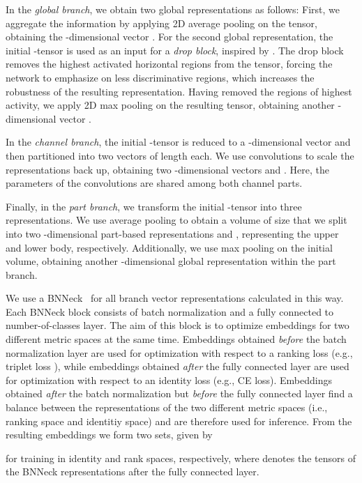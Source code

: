 \documentclass{article}
\begin{document}
In the \emph{global branch}, we obtain two global representations as follows: First, we aggregate the information by applying 2D average pooling on the tensor, obtaining the -dimensional vector . For the second global representation, the initial -tensor is used as an input for a \emph{drop block}, inspired by \cite{quispe2020top}. The drop block removes the highest activated horizontal regions from the tensor, forcing the network to emphasize on less discriminative regions, which increases the robustness of the resulting representation. Having removed the regions of highest activity, we apply 2D max pooling on the resulting tensor, obtaining another -dimensional vector .

In the \emph{channel branch}, the initial -tensor is reduced to a -dimensional vector and then partitioned into two vectors of length  each. We use  convolutions to scale the representations back up, obtaining two -dimensional vectors  and . Here, the parameters of the  convolutions are shared among both channel parts.

Finally, in the \emph{part branch}, we transform the initial -tensor into three representations. We use average pooling to obtain a volume of size  that we split into two -dimensional part-based representations  and , representing the upper and lower body, respectively. Additionally, we use max pooling on the initial volume, obtaining another -dimensional global representation  within the part branch.

We use a BNNeck~\cite{luo2019bag} for all branch vector representations calculated in this way. Each BNNeck block consists of batch normalization and a fully connected to number-of-classes layer. The aim of this block is to optimize embeddings for two different metric spaces at the same time. Embeddings obtained \emph{before} the batch normalization layer are used for optimization with respect to a ranking loss (e.g., triplet loss \cite{schroff2015facenet}), while embeddings obtained \emph{after} the fully connected layer are used for optimization with respect to an identity loss (e.g., \ac{CE} loss). Embeddings obtained \emph{after} the batch normalization but \emph{before} the fully connected layer find a balance between the representations of the two different metric spaces (i.e., ranking space and identitiy space) and are therefore used for inference. From the resulting embeddings we form two sets, given by

for training in identity and rank spaces, respectively, where  denotes the tensors of the BNNeck representations after the fully connected layer.
\end{document}
